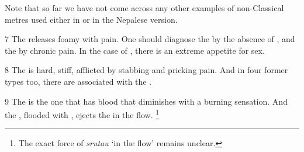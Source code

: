 Note that so far we have not come across any other examples of non-Classical metres used either in \cite{vulgate} or in the Nepalese version. 

\begin{translation}
\item [7] The  releases foamy  with pain. 
One should diagnose the  by the absence of , and the  by chronic pain.
In the case of , there is an extreme appetite for sex.

\item [8] The  is hard, stiff, afflicted by stabbing and pricking pain.
And in four former types too, there are  associated with the .

\item [9] The  is the one that has blood that diminishes with a burning sensation.
And the , flooded with , ejects the  in the flow. 
	\footnote{%
	The exact force of \emph{srutau} ‘in the flow’ remains unclear.%
	}


\end{translation}
